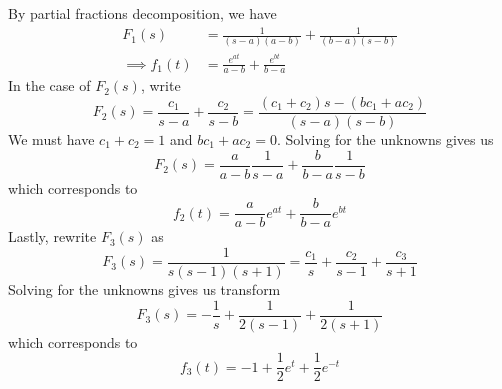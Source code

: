 \documentclass[a4paper]{article}
\begin{document}
By partial fractions decomposition, we have
\begin{align*}
	F_{1}\!\left( s  \right) & = \frac{1}{\!\left( s - a  \right)\!\left( a - b  \right)} + \frac{1}{\!\left( b - a  \right)\!\left( s - b \right)} \\
	\implies f_{1}\!\left( t  \right) & = \frac{e^{at}}{a - b} + \frac{e^{bt}}{b - a}
\end{align*}
In the case of \( F_{2}\!\left( s  \right) \), write
\[
	F_{2}\!\left( s  \right) = \frac{c_{1}}{s - a } + \frac{c_{2}}{s - b } = \frac{\!\left( c_{1} + c_{2} \right)s - \!\left( b c_{1} + a c_{2} \right)}{\!\left( s - a  \right)\!\left( s - b \right)}
\]
We must have \( c_{1} + c_{2} = 1 \) and \( bc_{1} + ac_{2} = 0 \). Solving for the unknowns gives us
\[
	F_{2}\!\left( s  \right) = \frac{a }{a - b }\frac{1}{s - a } + \frac{b }{b - a }\frac{1}{s - b} 
\]
which corresponds to
\[
	f_{2}\!\left( t  \right) = \frac{a }{a - b }e^{at } + \frac{b }{b - a }e^{bt} 
\]
Lastly, rewrite \( F_{3}\!\left( s  \right) \) as 
\[
	F_{3}\!\left( s  \right) = \frac{1}{s \!\left( s - 1 \right)\!\left( s + 1 \right)} = \frac{c_{1}}{s } + \frac{c_{2}}{s - 1} + \frac{c_{3}}{s + 1} 
\]
Solving for the unknowns gives us transform
\[
	F_{3}\!\left( s  \right) = -\frac{1}{s } + \frac{1}{2 \!\left( s - 1 \right)} + \frac{1}{2 \!\left( s + 1 \right)}
\]
which corresponds to
\[
	f_{3}\!\left( t  \right) = -1 + \frac{1}{2}e^{t } + \frac{1}{2}e^{-t} 
\]

\end{document}
